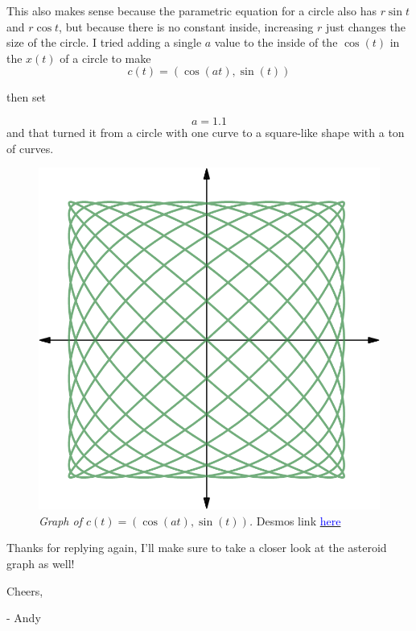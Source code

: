 \documentclass[12pt]{article}
\begin{document}
This also makes sense because the parametric equation for a circle also has $r\sin t$ and $r\cos t$, but because there is no constant inside, increasing $r$ just changes the size of the circle. I tried adding a single $a$ value to the inside of the $\cos(t)$ in the $x(t)$ of a circle to make
$$
c\left(t\right)=\left(\cos\left(at\right),\sin\left(t\right)\right)
$$
\begin{center}
then set 
\end{center}
$$
a=1.1
$$
and that turned it from a circle with one curve to a square-like shape with a ton of curves.
\begin{figure}[H]
  \begin{center}
    \includegraphics[scale=.3]{square.png}
    \caption{\textit{Graph of $c\left(t\right)=\left(\cos\left(at\right),\sin\left(t\right)\right)$.} Desmos link \href{https://www.desmos.com/calculator/z4lbq0xn0a}{\textcolor{blue}{here}}}
  \end{center}
\end{figure}

Thanks for replying again,
I'll make sure to take a closer look at the asteroid graph as well!
\bigskip

Cheers,

- Andy
\end{document}
